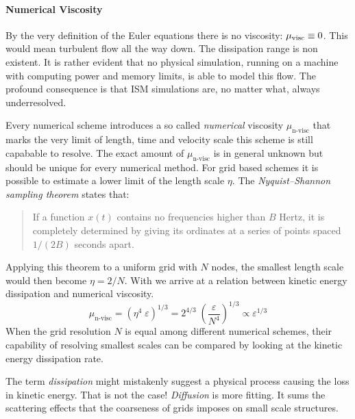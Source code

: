 \paragraph{Numerical Viscosity}
By the very definition of the Euler equations there is no viscosity:
$\mu_{\text{visc}} \equiv 0$. This would mean turbulent flow all the way down. The
dissipation range is non existent. It is rather evident that no physical
simulation, running on a machine with computing power and memory limits, is
able to model this flow. The profound consequence is that ISM simulations are,
no matter what, always underresolved.

Every numerical scheme introduces a so called \emph{numerical} viscosity
$\mu_{\text{n-visc}}$ that marks the very limit of length, time and velocity
scale this scheme is still capabable to resolve. The exact amount of
$\mu_{\text{n-visc}}$ is in general unknown but should be unique for every
numerical method. For grid based schemes it is possible to estimate a 
lower limit of the length scale $\eta$. The \emph{Nyquist–Shannon sampling
theorem} states that:
\begin{quote}
If a function $x(t)$ contains no frequencies higher than $B$ Hertz, it is
completely determined by giving its ordinates at a series of points spaced
$1/(2B)$ seconds apart.
\end{quote}
Applying this theorem to a uniform grid with $N$ nodes, the smallest length
scale would then become $\eta = 2/N$. With  we arrive at
a relation between kinetic energy dissipation and numerical viscosity.
\begin{equation}
\label{eqn:relation-ekin-diss-numerical-visc}
    \mu_{\text{n-visc}} = (\eta^4 \; \varepsilon)^{1/3} 
        = 2^{4/3}\;\left(\frac{\varepsilon}{N^4}\right)^{1/3}
        \propto \varepsilon^{1/3}
\end{equation}
When the grid resolution $N$ is equal among different numerical schemes,
their capability of resolving smallest scales can be compared by looking at the
kinetic energy dissipation rate.

\remark The term \emph{dissipation} might mistakenly suggest a physical process
causing the loss in kinetic energy. That is not the case! \emph{Diffusion} is
more fitting. It sums the scattering effects that the coarseness of grids
imposes on small scale structures.


